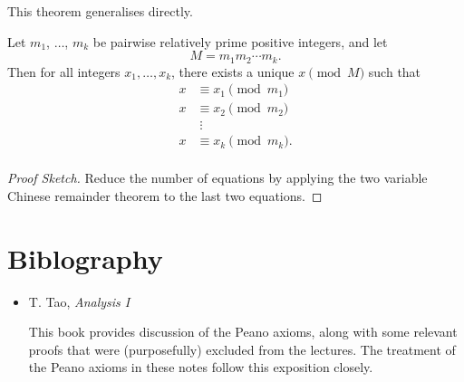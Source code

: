 \documentclass[a4paper]{scrreprt}
\begin{document}
This theorem generalises directly.

\begin{theorem}
	Let $m_1$, $\dots$, $m_k$ be pairwise relatively prime positive integers, and let 
	$$M = m_1 m_2 \cdots m_k.
	$$ Then for all integers $x_1, \dots, x_k$, there exists a unique $x \pmod{M}$ such that 
	\begin{align*}
		x & \equiv x_1 \pmod{m_1} \\
		x & \equiv x_2 \pmod{m_2} \\
			& \;\vdots \\
		x & \equiv x_k \pmod{m_k}. \\
	\end{align*}
\end{theorem}
\begin{proof}[Proof Sketch]
	Reduce the number of equations by applying the two variable Chinese remainder theorem to the last two equations.
\end{proof}














\clearpage
\chapter*{Biblography}

\begin{itemize}
	\item T. Tao, \emph{Analysis I}
	
	This book provides discussion of the Peano axioms, along with some relevant proofs that were (purposefully) excluded from the lectures. The treatment of the Peano axioms in these notes follow this exposition closely.
\end{itemize}
\end{document}
